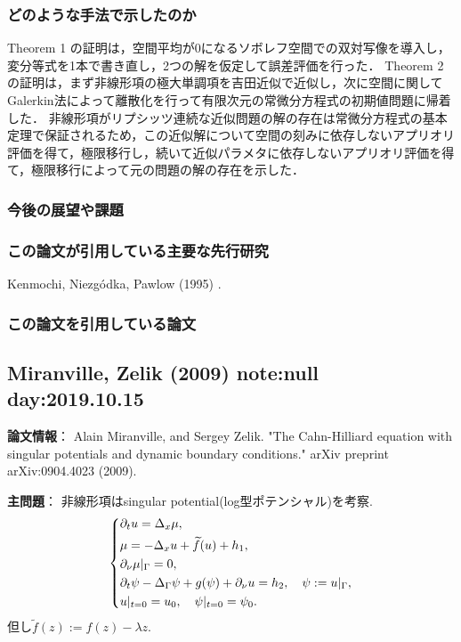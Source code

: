 \documentclass[openary, a4paper, oneside]{jsarticle}
\begin{document}
	\subsubsection{どのような手法で示したのか}
	Theorem 1 の証明は，空間平均が0になるソボレフ空間での双対写像を導入し，変分等式を1本で書き直し，2つの解を仮定して誤差評価を行った．
	Theorem 2 の証明は，まず非線形項の極大単調項を吉田近似で近似し，次に空間に関してGalerkin法によって離散化を行って有限次元の常微分方程式の初期値問題に帰着した．
	非線形項がリプシッツ連続な近似問題の解の存在は常微分方程式の基本定理で保証されるため，この近似解について空間の刻みに依存しないアプリオリ評価を得て，極限移行し，続いて近似パラメタに依存しないアプリオリ評価を得て，極限移行によって元の問題の解の存在を示した．
	\subsubsection{今後の展望や課題}
	\subsubsection{この論文が引用している主要な先行研究}
	Kenmochi, Niezg\'odka, Pawlow (1995) \cite{KenmochiNiezgodkaPawlow1995}.
	\subsubsection{この論文を引用している論文}

\newpage
	

\subsection{Miranville, Zelik (2009) \cite{MiranvilleZelik2009} note:null day:2019.10.15}
{\bf 論文情報}：
Alain Miranville, and Sergey Zelik. "The Cahn-Hilliard equation with singular potentials and dynamic boundary conditions." arXiv preprint arXiv:0904.4023 (2009).

{\bf 主問題}：
非線形項はsingular potential(log型ポテンシャル)を考察.
\begin{equation}\left\{\begin{aligned}
	&\partial_t u = \Delta_x \mu,\\
	&\mu = -\Delta_x u + \widetilde{f}(u) + h_1,\\
	&\partial_{\nu}\mu|_{\Gamma} = 0,\\
	&\partial_t\psi - \Delta_{\Gamma}\psi + g(\psi) +\partial_{\nu} u = h_2,\quad \psi := u|_{\Gamma},\\
	&u|_{t=0} = u_0,\quad \psi|_{t=0} = \psi_0.
\end{aligned}\right.\end{equation}
但し$\tilde{f}(z) := f(z) - \lambda z$.
\end{document}
